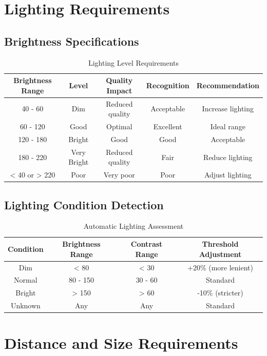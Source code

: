 \documentclass[12pt,a4paper]{article}
\begin{document}
\section{Lighting Requirements}

\subsection{Brightness Specifications}

\begin{table}[h!]
\centering
\caption{Lighting Level Requirements}
\begin{tabular}{|c|c|c|c|c|}
\hline
\textbf{Brightness Range} & \textbf{Level} & \textbf{Quality Impact} & \textbf{Recognition} & \textbf{Recommendation} \\
\hline
40 - 60 & Dim & Reduced quality & Acceptable & Increase lighting \\
\hline
60 - 120 & Good & Optimal & Excellent & Ideal range \\
\hline
120 - 180 & Bright & Good & Good & Acceptable \\
\hline
180 - 220 & Very Bright & Reduced quality & Fair & Reduce lighting \\
\hline
< 40 or > 220 & Poor & Very poor & Poor & Adjust lighting \\
\hline
\end{tabular}
\end{table}

\subsection{Lighting Condition Detection}

\begin{table}[h!]
\centering
\caption{Automatic Lighting Assessment}
\begin{tabular}{|c|c|c|c|}
\hline
\textbf{Condition} & \textbf{Brightness Range} & \textbf{Contrast Range} & \textbf{Threshold Adjustment} \\
\hline
Dim & < 80 & < 30 & +20\% (more lenient) \\
\hline
Normal & 80 - 150 & 30 - 60 & Standard \\
\hline
Bright & > 150 & > 60 & -10\% (stricter) \\
\hline
Unknown & Any & Any & Standard \\
\hline
\end{tabular}
\end{table}

\section{Distance and Size Requirements}
\end{document}

